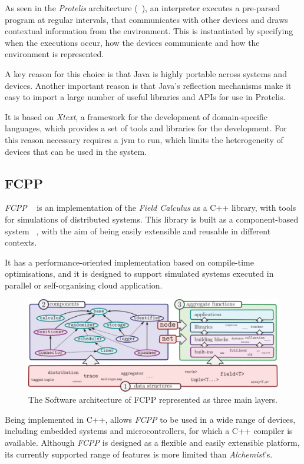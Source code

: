 As seen in the \emph{Protelis} architecture (~), an interpreter executes a pre-parsed program at regular intervals,
that communicates with other devices and draws contextual information from the environment.
This is instantiated by specifying when the executions occur, how the devices communicate and how the environment is
represented.

A key reason for this choice is that Java is highly portable across systems and devices.
Another important reason is that Java's reflection mechanisms make it easy to import a large number of useful libraries
and APIs for use in Protelis.

It is based on \emph{Xtext}, a framework for the development of domain-specific languages, which provides a set of tools
and libraries for the development.
For this reason necessary requires a \ac{jvm} to run, which limits the heterogeneity of devices
that can be used in the system.

\subsection{FCPP}
\label{subsec:fcpp}
\emph{FCPP} ~\cite{9196401} is an implementation of the \emph{Field Calculus} as a C++ library, with tools for simulations of distributed systems.
This library is built as a component-based system ~, with the aim of being easily extensible and reusable in different contexts.

It has a performance-oriented implementation based on compile-time optimisations, and it is designed to support
simulated systems executed in parallel or self-organising cloud application.

\begin{figure}
    \centering
    \includegraphics[width=.8\linewidth]{figures/fcpp-structure}
    \caption{The Software architecture of FCPP represented as three main layers.}
    \label{fig:fcpp-structure}
\end{figure}

Being implemented in C++, allows \emph{FCPP} to be used in a wide range of devices, including embedded systems and
microcontrollers, for which a C++ compiler is available.
Although \emph{FCPP} is designed as a flexible and easily extensible platform, its currently supported range of features
is more limited than \emph{Alchemist}'s.

